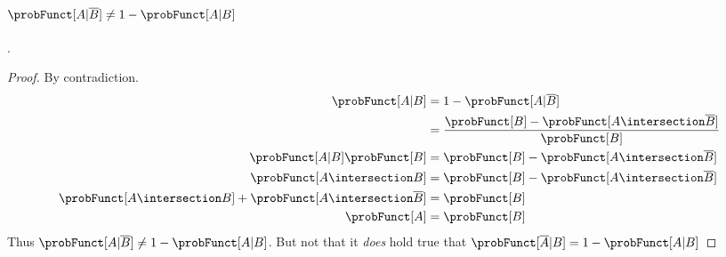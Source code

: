 \paragraph{$\probFunct[A|\overline{B}] \neq 1 - \probFunct[A | B]$}. 
\begin{proof}
    By contradiction. 
    \begin{equation}
        \begin{aligned}
           \probFunct[A|B]                 &= 1 - \probFunct[A | \overline{B}] \\
                                           &= \frac{  \probFunct[B] - \probFunct[A \intersection \overline{B}]  }{  \probFunct[B]  }  \\
           \probFunct[A|B] \probFunct[B]   &=         \probFunct[B] - \probFunct[A \intersection \overline{B}] \\
           \probFunct[A \intersection B]   &= \probFunct[B] - \probFunct[A \intersection \overline{B}] \\
           \probFunct[A \intersection B] + \probFunct[A \intersection \overline{B}]  &= \probFunct[B] \\
           \probFunct[A] &= \probFunct[B]
        \end{aligned}
    \end{equation}
    Thus $\probFunct[A|\overline{B}] \neq 1 - \probFunct[A | B]$. But not that it \emph{does} hold true that $\probFunct[\overline{A}|B] = 1 - \probFunct[A | B]$
\end{proof}

